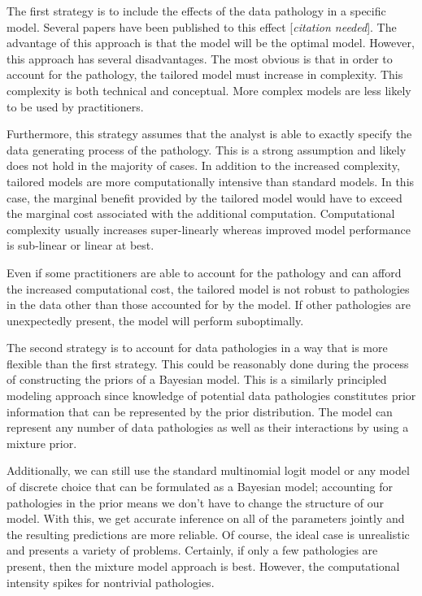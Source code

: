 \documentclass[12pt,titlepage]{mktg-article}
\begin{document}
The first strategy is to include the effects of the data pathology in a specific model. Several papers have been published to this effect {[}\emph{citation needed}{]}. The advantage of this approach is that the model will be the optimal model. However, this approach has several disadvantages. The most obvious is that in order to account for the pathology, the tailored model must increase in complexity. This complexity is both technical and conceptual. More complex models are less likely to be used by practitioners.

Furthermore, this strategy assumes that the analyst is able to exactly specify the data generating process of the pathology. This is a strong assumption and likely does not hold in the majority of cases. In addition to the increased complexity, tailored models are more computationally intensive than standard models. In this case, the marginal benefit provided by the tailored model would have to exceed the marginal cost associated with the additional computation. Computational complexity usually increases super-linearly whereas improved model performance is sub-linear or linear at best.

Even if some practitioners are able to account for the pathology and can afford the increased computational cost, the tailored model is not robust to pathologies in the data other than those accounted for by the model. If other pathologies are unexpectedly present, the model will perform suboptimally.

The second strategy is to account for data pathologies in a way that is more flexible than the first strategy. This could be reasonably done during the process of constructing the priors of a Bayesian model. This is a similarly principled modeling approach since knowledge of potential data pathologies constitutes prior information that can be represented by the prior distribution. The model can represent any number of data pathologies as well as their interactions by using a mixture prior.

Additionally, we can still use the standard multinomial logit model or any model of discrete choice that can be formulated as a Bayesian model; accounting for pathologies in the prior means we don't have to change the structure of our model. With this, we get accurate inference on all of the parameters jointly and the resulting predictions are more reliable. Of course, the ideal case is unrealistic and presents a variety of problems. Certainly, if only a few pathologies are present, then the mixture model approach is best. However, the computational intensity spikes for nontrivial pathologies.
\end{document}
